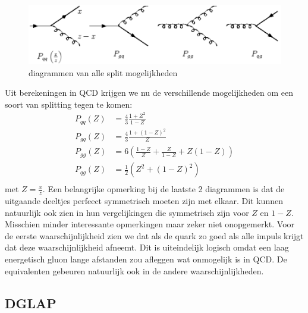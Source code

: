 \documentclass[../main.tex]{subfiles}
\begin{document}
\begin{figure}[h]
    \centering
    \includegraphics[width=0.8\linewidth]{QCD/split_func_all.png}
    \caption{diagrammen van alle split mogelijkheden}%
    \label{fig:split_func_all}
\end{figure}

Uit berekeningen in QCD krijgen we nu de verschillende mogelijkheden om een soort van splitting tegen te komen:
\begin{equation}
    \begin{aligned}
        \label{eq:}
        P_{qq}(Z) &= \frac{4}{3} \frac{1+Z^2}{1-Z} \\
        P_{gq}(Z) &= \frac{4}{3} \frac{1+(1-Z)^2}{Z} \\
        P_{gg}(Z) &= 6 \left( \frac{1-Z}{Z} + \frac{Z}{1-Z} + Z(1-Z) \right) \\
        P_{qg}(Z) &= \frac{1}{2} \left( Z^2 + (1-Z)^2 \right) \\
    \end{aligned}
\end{equation}
met $Z= \frac{x}{z}$. Een belangrijke opmerking bij de laatste 2 diagrammen is dat de uitgaande deeltjes perfeect symmetrisch moeten zijn met elkaar. Dit kunnen natuurlijk ook zien in hun vergelijkingen die symmetrisch zijn voor $Z$ en $1-Z$. Misschien minder interessante opmerkingen maar zeker niet onopgemerkt. Voor de eerste waarschijnlijkheid zien we dat als de quark zo goed als alle impuls krijgt dat deze waarschijnlijkheid afneemt. Dit is uiteindelijk logisch omdat een laag energetisch gluon lange afstanden zou afleggen wat onmogelijk is in QCD. De equivalenten gebeuren natuurlijk ook in de andere waarschijnlijkheden.

\subsection{DGLAP}%
\label{sub:dglap}
\end{document}
